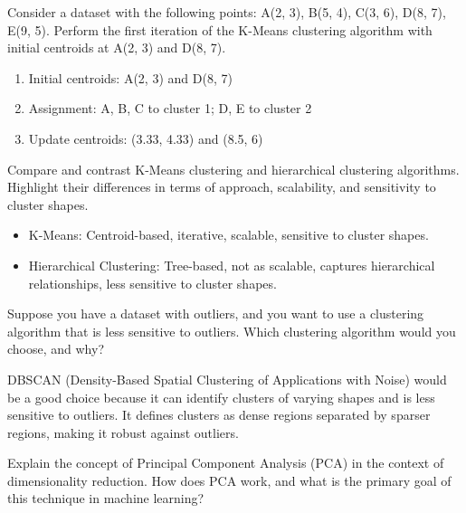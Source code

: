 \documentclass[a4paper,11pt,addpoints]{exam}
\begin{document}
\begin{questions}
    \question[5] 
    Consider a dataset with the following points: A(2, 3), B(5, 4), C(3, 6), D(8, 7), E(9, 5). Perform the first iteration of the K-Means clustering algorithm with initial centroids at A(2, 3) and D(8, 7).
    
    \begin{solution}[3in]
        \begin{enumerate}
            \item Initial centroids: A(2, 3) and D(8, 7)
            \item Assignment: A, B, C to cluster 1; D, E to cluster 2
            \item Update centroids: (3.33, 4.33) and (8.5, 6)
        \end{enumerate}
        
    \end{solution}
    
    \question[5]
    Compare and contrast K-Means clustering and hierarchical clustering algorithms. Highlight their differences in terms of approach, scalability, and sensitivity to cluster shapes.
    
    \begin{solution}[3in]
        \begin{itemize}
            \item K-Means: Centroid-based, iterative, scalable, sensitive to cluster shapes.
            \item Hierarchical Clustering: Tree-based, not as scalable, captures hierarchical relationships, less sensitive to cluster shapes.
        \end{itemize}
    \end{solution}
    
    \question[5]
    Suppose you have a dataset with outliers, and you want to use a clustering algorithm that is less sensitive to outliers. Which clustering algorithm would you choose, and why?
    
    \begin{solution}[3in]
        DBSCAN (Density-Based Spatial Clustering of Applications with Noise) would be a good choice because it can identify clusters of varying shapes and is less sensitive to outliers. It defines clusters as dense regions separated by sparser regions, making it robust against outliers.
    \end{solution}

    \question[10]
    Explain the concept of Principal Component Analysis (PCA) in the context of dimensionality reduction. How does PCA work, and what is the primary goal of this technique in machine learning?
    

\end{questions}
\end{document}
